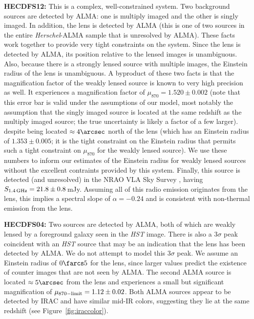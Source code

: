 \documentclass[iop]{emulateapj}
\begin{document}
{\bf HECDFS12:} This is a complex, well-constrained system.  Two background
sources are detected by ALMA: one is multiply imaged and the other is singly
imaged.  In addition, the lens is detected by ALMA (this is one of two sources
in the entire {\it Herschel}-ALMA sample that is unresolved by ALMA).  These
facts work together to provide very tight constraints on the system.  Since the
lens is detected by ALMA, its position relative to the lensed images is
unambiguous.  Also, because there is a strongly lensed source with multiple
images, the Einstein radius of the lens is unambiguous.  A byproduct of these
two facts is that the magnification factor of the weakly lensed source is known
to very high precision as well.  It experiences a magnification factor of
$\mu_{870} = 1.520\pm0.002$ (note that this error bar is valid under the
assumptions of our model, most notably the assumption that the singly imaged
source is located at the same redshift as the multiply imaged source; the true
uncertainty is likely a factor of a few larger).  despite being located
$\approx4\arcsec$ north of the lens (which has an Einstein radius of
$1.353\pm0.005$; it is the tight constraint on the Einstein radius that permits
such a tight constraint on $\mu_{870}$ for the weakly lensed source).  We use
these numbers to inform our estimates of the Einstein radius for weakly lensed
sources without the excellent contraints provided by this system.  Finally,
this source is detected (and unresolved) in the NRAO VLA Sky Survey
\citep{Condon:1998uq}, having $S_{\rm 1.4\,GHz} = 21.8 \pm 0.8\,$mJy.  Assuming
all of this radio emission originates from the lens, this implies a spectral
slope of $\alpha = -0.24$ and is consistent with non-thermal emission from the
lens.

{\bf HECDFS04:} Two sources are detected by ALMA, both of which are weakly
lensed by a foreground galaxy seen in the {\it HST} image.  There is also a
3$\sigma$ peak coincident with an {\it HST} source that may be an indication
that the lens has been detected by ALMA.  We do not attempt to model this
3$\sigma$ peak.  We assume an Einstein radius of $0\farcs5$ for the lens, since
larger values predict the existence of counter images that are not seen by
ALMA.  The second ALMA source is located $\approx5\arcsec$ from the lens and
experiences a small but significant magnification of $\mu_{\rm 870-limit} =
1.12 \pm 0.02$.  Both ALMA sources appear to be detected by IRAC and have
similar mid-IR colors, suggesting they lie at the same redshift (see
Figure~\ref{fig:iraccolor}).  
\end{document}
